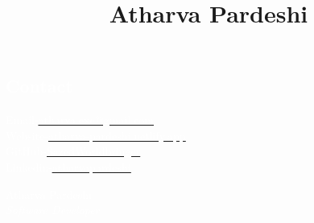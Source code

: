 \documentclass[11pt, oneside, a4paper, titlepage]{article}
\title{Atharva Pardeshi}
\date{}
\begin{document}
\begin{tcolorbox}
  \begin{minipage}{4.5cm}
    \subsection{\textcolor{white}{Contact}}
    \textcolor{white}{Email-}\href{mailto:atharva.exe@gmail.com}{\underline{\textcolor{white}{atharva.exe@gmail.com}}} \\
    \textcolor{white}{Website-}\href{https://atharva-pardeshi.netlify.app}{\underline{\textcolor{white}{atharva-pardeshi.netlify.app}}} \\
    \textcolor{white}{GitHub-}\href{https://github.com/SazedWorldbringer}{\underline{\textcolor{white}{SazedWorldbringer}}} \\
    \textcolor{white}{Linkedin-}\href{https://linkedin.com/in/atharvapardeshi}{\underline{\textcolor{white}{atharvapardeshi}}} \\
  \end{minipage}
  \begin{minipage}{15cm}
    \begin{center}
      \Huge{\textcolor{white}{Atharva Pardeshi}} \\
      \vspace*{0.5cm}
      \Large{\textcolor{white}{\textit{Software Developer}}}
    \end{center}
  \end{minipage}
\end{tcolorbox}
\end{document}
